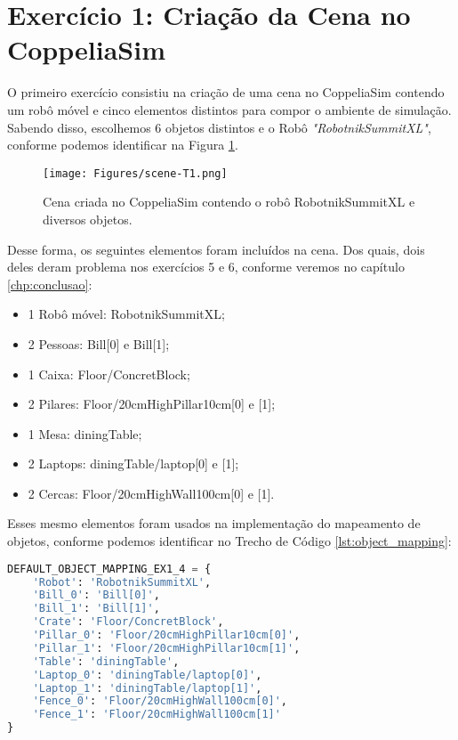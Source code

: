 \section{Exercício 1: Criação da Cena no CoppeliaSim} \label{sec:ex1}

O primeiro exercício consistiu na criação de uma cena no CoppeliaSim contendo um robô móvel e cinco elementos distintos para compor o ambiente de simulação. Sabendo disso, escolhemos 6 objetos distintos e o Robô \textit{"RobotnikSummitXL"}, conforme podemos identificar na Figura \ref{fig:scene-t1}.

\begin{figure}[H]
\centering
\texttt{[image: Figures/scene-T1.png]}
\caption{Cena criada no CoppeliaSim contendo o robô RobotnikSummitXL e diversos objetos.}
\label{fig:scene-t1}
\end{figure}

Desse forma, os seguintes elementos foram incluídos na cena. Dos quais, dois deles deram problema nos exercícios 5 e 6, conforme veremos no capítulo \ref{chp:conclusao}:
\begin{itemize}
    \item 1 Robô móvel: RobotnikSummitXL;
    \item 2 Pessoas: Bill[0] e Bill[1];
    \item 1 Caixa: Floor/ConcretBlock;
    \item 2 Pilares: Floor/20cmHighPillar10cm[0] e [1];
    \item 1 Mesa: diningTable;
    \item 2 Laptops: diningTable/laptop[0] e [1];
    \item 2 Cercas: Floor/20cmHighWall100cm[0] e [1].
\end{itemize}

Esses mesmo elementos foram usados na implementação do mapeamento de objetos, conforme podemos identificar no Trecho de Código \ref{lst:object_mapping}:

\begin{lstlisting}[language=Python, caption=Mapeamento de objetos para o CoppeliaSim., label=lst:object_mapping]
DEFAULT_OBJECT_MAPPING_EX1_4 = {
    'Robot': 'RobotnikSummitXL',
    'Bill_0': 'Bill[0]',
    'Bill_1': 'Bill[1]',
    'Crate': 'Floor/ConcretBlock',
    'Pillar_0': 'Floor/20cmHighPillar10cm[0]',
    'Pillar_1': 'Floor/20cmHighPillar10cm[1]',
    'Table': 'diningTable',
    'Laptop_0': 'diningTable/laptop[0]',
    'Laptop_1': 'diningTable/laptop[1]',
    'Fence_0': 'Floor/20cmHighWall100cm[0]',
    'Fence_1': 'Floor/20cmHighWall100cm[1]'
}
\end{lstlisting}

